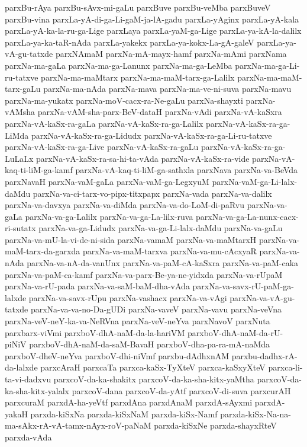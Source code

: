 {parxBu-rAya
parxBu-sAvx-mi-gaLu
parxBuve
parxBu-veMba
parxBuveV
parxBu-vina
parxLa-yA-di-ga-Li-gaM-ja-lA-gadu
parxLa-yAginx
parxLa-yA-kala
parxLa-yA-ka-la-ru-ga-Lige
parxLaya
parxLa-yaM-ga-Lige
parxLa-ya-kA-la-dalilx
parxLa-ya-ka-taR-nAda
parxLa-yakekx
parxLa-ya-kokx-La-gA-galeV
parxLa-ya-vA-gu-tatxde
parxNAmaM
parxNa-mA-mayx-hamf
parxNa-mAmi
parxNama
parxNa-ma-gaLa
parxNa-ma-ga-Lanunx
parxNa-ma-ga-LeMba
parxNa-ma-ga-Li-ru-tatxve
parxNa-ma-maMtarx
parxNa-ma-maM-tarx-ga-Lalilx
parxNa-ma-maM-tarx-gaLu
parxNa-ma-nAda
parxNa-mava
parxNa-ma-ve-ni-suva
parxNa-mavu
parxNa-ma-yukatx
parxNa-moV-cacx-ra-Ne-gaLu
parxNa-shayxti
parxNa-vAMsha
parxNa-vAM-sha-parx-BeV-dataH
parxNa-vAdi
parxNa-vA-kaSxra
parxNa-vA-kaSx-ra-gaLa
parxNa-vA-kaSx-ra-ga-Lalilx
parxNa-vA-kaSx-ra-ga-LiMda
parxNa-vA-kaSx-ra-ga-Lidudx
parxNa-vA-kaSx-ra-ga-Li-ru-tatxve
parxNa-vA-kaSx-ra-ga-Live
parxNa-vA-kaSx-ra-gaLu
parxNa-vA-kaSx-ra-ga-LuLaLx
parxNa-vA-kaSx-ra-sa-hi-ta-vAda
parxNa-vA-kaSx-ra-vide
parxNa-vA-kaq-ti-liM-ga-kamf
parxNa-vA-kaq-ti-liM-ga-sathxla
parxNava
parxNa-va-BeVda
parxNavaH
parxNa-vaM-gaLa
parxNa-vaM-ga-LegxyuM
parxNa-vaM-ga-Li-lalx-daMdu
parxNa-va-ci-tarx-vo-pipx-titxpapx
parxNa-vada
parxNa-va-dalilx
parxNa-va-davxya
parxNa-va-diMda
parxNa-va-do-LoM-di-paRvu
parxNa-va-gaLa
parxNa-va-ga-Lalilx
parxNa-va-ga-La-lilx-ruva
parxNa-va-ga-La-nunx-cacx-ri-sutatx
parxNa-va-ga-Lidudx
parxNa-va-ga-Li-lalx-daMdu
parxNa-va-gaLu
parxNa-va-mU-la-vi-de-ni-sida
parxNa-vamaM
parxNa-va-maMtarxH
parxNa-va-maM-tarx-da-garxda
parxNa-va-maM-tarxva
parxNa-va-mu-cAcxyaR
parxNa-va-nAda
parxNa-va-nA-da-vanUnx
parxNa-va-paM-cA-kaSxra
parxNa-va-paM-caka
parxNa-va-paM-ca-kamf
parxNa-va-parx-Be-ya-ne-yidxda
parxNa-va-rUpaM
parxNa-va-rU-pada
parxNa-va-saM-baM-dha-vAda
parxNa-va-savx-rU-paM-ga-lalxde
parxNa-va-savx-rUpu
parxNa-vashacx
parxNa-va-vAgi
parxNa-va-vA-gu-tatxde
parxNa-va-va-no-Da-gUDi
parxNa-vaveV
parxNa-vavu
parxNa-veVna
parxNa-veV-neY-ka-va-NeRVna
parxNa-veV-neYva
parxNavoV
parxNuta
parxbarx-viVmi
parxboV-dhA-naM-da-la-hariVM
parxboV-dhA-naM-da-rU-piNiV
parxboV-dhA-naM-da-saM-BavaH
parxboV-dha-pa-ra-mA-naMda
parxboV-dheV-neYva
parxboV-dhi-niVmf
parxbu-dAdhxnAM
parxbu-dadhx-rA-da-lalxde
parxcAraH
parxcaTa
parxca-kaSx-TyXteV
parxca-kaSxyXteV
parxca-li-ta-vi-dadxvu
parxcoV-da-ka-shakitx
parxcoV-da-ka-sha-kitx-yaMtha
parxcoV-da-ka-sha-kitx-yalalx
parxcoV-dana
parxcoV-da-yAtf
parxcoV-di-suva
parxcurAH
parxcuraM
parxdA-ha-yeVtf
parxdAna
parxdAnaM
parxdA-sAyxmi
parxdA-yakaH
parxda-kiSxNa
parxda-kiSxNaM
parxda-kiSx-Namf
parxda-kiSx-Na-na-ma-sAkx-rA-vA-tamx-nAyx-roV-paNaM
parxda-kiSxNe
parxda-shayxRteV
parxda-vAda
}
